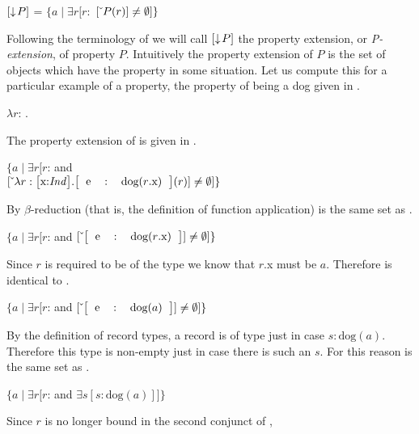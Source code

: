 \begin{ex} 
$[\downarrow\!P]$ = $\{a\mid\exists r[r:$
 $[\ \!\check{}\ \!P(r)]\not=\emptyset]\}$ 
\label{ex:propext}
\end{ex} 
Following the terminology of \cite{Cooper2011,Cooper2013} we will call
$[\downarrow\!P]$ the property extension, or \textit{P-extension}, of
property $P$. Intuitively the property extension of $P$ is the set of
objects which have the property in some situation.  Let us compute
this for a particular example of a property, the property of being a
dog given in \nexteg{}. 
\begin{ex} 
$\lambda r$: .  
\end{ex}
The property extension of \preveg{} is given in \nexteg{}.
\begin{ex} 
$\{a\mid\exists
  r[r$: and \\
\hspace*{2em}$\down{\lambda
  r:\text{\smallrecord{\smalltfield{x}{\textit{Ind}}}}
  . \text{\record{\tfield{e}{dog($r$.x)}}}(r)} \not=\emptyset]\}$ 
\end{ex} 
By $\beta$-reduction (that is, the definition of function application) \preveg{} is the same set as \nexteg{}.
\begin{ex} 
$\{a\mid\exists
  r[r$: and 
$\down{\text{\record{\tfield{e}{dog($r$.x)}}}} \not=\emptyset]\}$  
\end{ex} 
Since $r$ is required to be of the type
 we know that $r$.x
must be $a$.  Therefore \preveg{} is identical to \nexteg{}.
\begin{ex} 
$\{a\mid\exists
  r[r$: and 
$\down{\text{\record{\tfield{e}{dog($a$)}}}} \not=\emptyset]\}$ 
\end{ex} 
By the definition of record types, a record
 is of type
 just in case $s:\text{dog}(a)$.
Therefore this type is non-empty just in case there is such an $s$.
For this reason \preveg{} is the same set as \nexteg{}.
\begin{ex} 
$\{a\mid\exists
  r[r$: and 
$\exists s [s:\text{dog}(a)]]\}$ 
\end{ex}
Since $r$ is no longer bound in the second conjunct of \preveg{},
